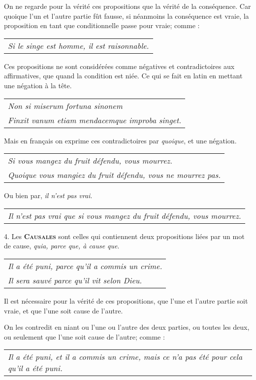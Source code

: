 On ne regarde pour la vérité ces propositions que la vérité de la conséquence. Car quoique l'un et l'autre partie fût fausse, si néanmoins la conséquence est vraie, la proposition en tant que conditionnelle passe pour vraie; comme :
	\begin{tabularx}{\textwidth}{X}
		\emph{Si le singe est homme, il est raisonnable.} \\
	\end{tabularx}

Ces propositions ne sont considérées comme négatives et contradictoires aux affirmatives, que quand la condition est niée. Ce qui se fait en latin en mettant une négation à la tête.
	\begin{tabularx}{\textwidth}{X}
		\emph{Non si miserum fortuna sinonem} \\
		\emph{Finxit vanum etiam mendacemque improba singet.} \\
	\end{tabularx}

Mais en français on exprime ces contradictoires par \emph{quoique}, et une négation.
	\begin{tabularx}{\textwidth}{X}
		\emph{Si vous mangez du fruit défendu, vous mourrez.} \\
		\emph{Quoique vous mangiez du fruit défendu, vous ne mourrez pas.} \\
	\end{tabularx}

Ou bien par, \emph{il n'est pas vrai}.
	\begin{tabularx}{\textwidth}{X}
		\emph{Il n'est pas vrai que si vous mangez du fruit défendu, vous mourrez.} \\
	\end{tabularx}

\bigbreak
{4.} Les {\bfseries\scshape Causales} sont celles qui contiennent deux propositions liées
par un mot de cause, \emph{quia, parce que, à cause que}.
	\begin{tabularx}{\textwidth}{X}
		\emph{Il a été puni, parce qu'il a commis un crime.} \\
		\emph{Il sera sauvé parce qu'il vit selon Dieu.} \\
	\end{tabularx}

Il est nécessaire pour la vérité de ces propositions, que l'une et l'autre partie soit vraie, et que l'une soit cause de l'autre.

On les contredit en niant ou l'une ou l'autre des deux parties, ou toutes les deux, ou seulement que l'une soit cause de l'autre; comme :
	\begin{tabularx}{\textwidth}{X}
\emph{Il a été puni, et il a commis un crime, mais ce n'a pas été pour cela qu'il a été puni.}
	\end{tabularx}


